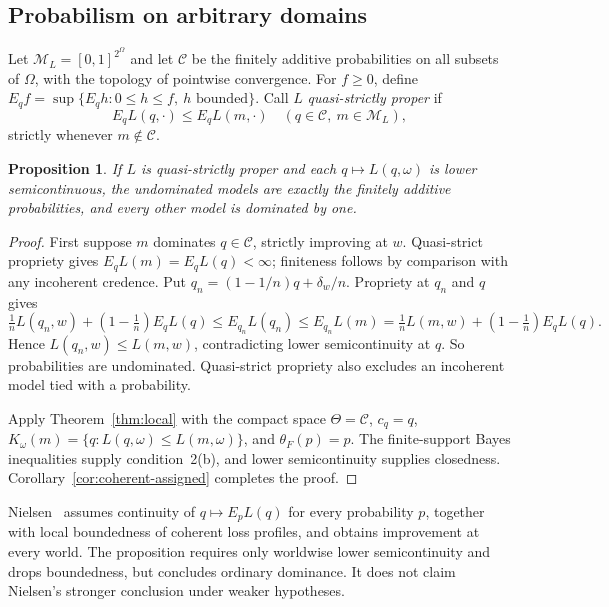 \documentclass[11pt]{article}
\newtheorem{proposition}[theorem]{Proposition}
\theoremstyle{definition}
\newcommand{\M}{\mathcal M}
\newcommand{\C}{\mathcal C}
\begin{document}
\subsection{Probabilism on arbitrary domains}
Let $\M_L=[0,1]^{2^\Omega}$ and let $\C$ be the finitely additive probabilities on all subsets of $\Omega$, with the topology of pointwise convergence. For $f\ge0$, define $E_qf=\sup\{E_qh:0\le h\le f,\ h\text{ bounded}\}$. Call $L$ \emph{quasi-strictly proper} if
\[
E_qL(q,\cdot)\le E_qL(m,\cdot)\quad(q\in\C,\ m\in\M_L),
\]
strictly whenever $m\notin\C$.
\begin{proposition}\label{prop:short-infinite}
If $L$ is quasi-strictly proper and each $q\mapsto L(q,\omega)$ is lower semicontinuous, the undominated models are exactly the finitely additive probabilities, and every other model is dominated by one.
\end{proposition}
\begin{proof}
First suppose $m$ dominates $q\in\C$, strictly improving at $w$. Quasi-strict propriety gives $E_qL(m)=E_qL(q)<\infty$; finiteness follows by comparison with any incoherent credence. Put $q_n=(1-1/n)q+\delta_w/n$. Propriety at $q_n$ and $q$ gives
\[
\tfrac1nL(q_n,w)+(1-\tfrac1n)E_qL(q)
\le E_{q_n}L(q_n)\le E_{q_n}L(m)
=\tfrac1nL(m,w)+(1-\tfrac1n)E_qL(q).
\]
Hence $L(q_n,w)\le L(m,w)$, contradicting lower semicontinuity at $q$. So probabilities are undominated. Quasi-strict propriety also excludes an incoherent model tied with a probability.

Apply Theorem~\ref{thm:local} with the compact space $\Theta=\C$, $c_q=q$, $K_\omega(m)=\{q:L(q,\omega)\le L(m,\omega)\}$, and $\theta_F(p)=p$. The finite-support Bayes inequalities supply condition~2(b), and lower semicontinuity supplies closedness. Corollary~\ref{cor:coherent-assigned} completes the proof.
\end{proof}
Nielsen~\cite{Nielsen} assumes continuity of $q\mapsto E_pL(q)$ for every probability $p$, together with local boundedness of coherent loss profiles, and obtains improvement at every world. The proposition requires only worldwise lower semicontinuity and drops boundedness, but concludes ordinary dominance. It does not claim Nielsen's stronger conclusion under weaker hypotheses.
\end{document}
